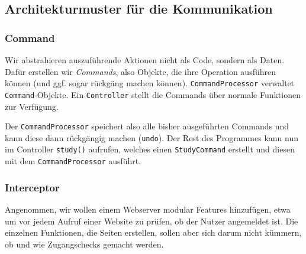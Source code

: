 \documentclass{panikzettel}
\begin{document}
\subsection{Architekturmuster für die Kommunikation}

\subsubsection{Command}

Wir abstrahieren auszuführende Aktionen nicht als Code, sondern als Daten. Dafür erstellen wir \emph{Commands}, also Objekte, die ihre Operation ausführen können (und ggf. sogar rückgäng machen können). \lstinline{CommandProcessor} verwaltet \lstinline{Command}-Objekte. Ein \lstinline{Controller} stellt die Commands über normale Funktionen zur Verfügung.


Der \lstinline{CommandProcessor} speichert also alle bisher ausgeführten Commands und kann diese dann rückgängig machen (\lstinline{undo}). Der Rest des Programmes kann nun im Controller \lstinline{study()} aufrufen, welches einen \lstinline{StudyCommand} erstellt und diesen mit dem \lstinline{CommandProcessor} ausführt.

\subsubsection{Interceptor}

Angenommen, wir wollen einem Webserver modular Features hinzufügen, etwa um vor jedem Aufruf einer Website zu prüfen, ob der Nutzer angemeldet ist. Die einzelnen Funktionen, die Seiten erstellen, sollen aber sich darum nicht kümmern, ob und wie Zugangschecks gemacht werden.
\end{document}
